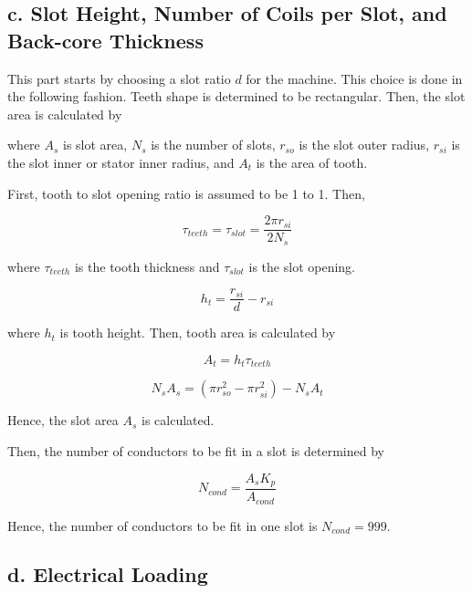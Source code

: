 \documentclass[a4paper, 11pt, titlepage]{article}
\begin{document}
\subsection{c. Slot Height, Number of Coils per Slot, and Back-core Thickness}

This part starts by choosing a slot ratio $d$ for the machine. This choice is done in the following fashion. Teeth shape is determined to be rectangular. Then, the slot area is calculated by



where $A_s$ is slot area, $N_s$ is the number of slots, $r_{so}$ is the slot outer radius, $r_{si}$ is the slot inner or stator inner radius, and $A_t$ is the area of tooth.

First, tooth to slot opening ratio is assumed to be 1 to 1. Then, 

\begin{equation}
	\tau_{teeth} = \tau_{slot} = \frac{2\pi r_{si}}{2N_s}
\end{equation}

where $\tau_{teeth}$ is the tooth thickness and $\tau_{slot}$ is the slot opening. 

\begin{equation}
	h_t = \frac{r_{si}}{d}-r_{si}
\end{equation}

where $h_t$ is tooth height. Then, tooth area is calculated by

\begin{equation}
	A_t = h_t \tau_{teeth}
\end{equation}

\begin{equation}
	N_sA_s = (\pi r_{so}^2 - \pi r_{si}^2)-N_sA_t
\end{equation}

Hence, the slot area $A_s$ is calculated.

Then, the number of conductors to be fit in a slot is determined by

\begin{equation}
	N_{cond} = \frac{A_sK_p}{A_{cond}}
	\label{eq:numberOfConductorsPerSlot}
\end{equation}

Hence, the number of conductors to be fit in one slot is $N_{cond}=999$. 


\subsection{d. Electrical Loading}
\end{document}
